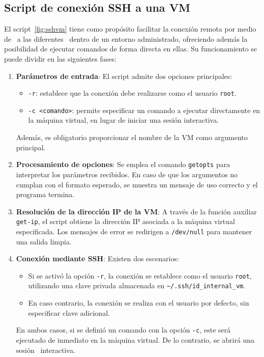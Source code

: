 \subsection{Script de conexión SSH a una VM}
\noindent
El script~\ref{fig:sshvm} tiene como propósito facilitar la conexión remota por medio de \SSH\ a las diferentes \VM\ dentro de un entorno administrado, ofreciendo además la posibilidad de ejecutar comandos de forma directa en ellas. Su funcionamiento se puede dividir en las siguientes fases:

\begin{enumerate}
    \item \textbf{Parámetros de entrada}:  
    El script admite dos opciones principales:
    \begin{itemize}
        \item \texttt{-r}: establece que la conexión debe realizarse como el usuario \texttt{root}.
        \item \texttt{-c <comando>}: permite especificar un comando a ejecutar directamente en la máquina virtual, en lugar de iniciar una sesión interactiva.
    \end{itemize}
    Además, es obligatorio proporcionar el nombre de la VM como argumento principal.

    \item \textbf{Procesamiento de opciones}:  
    Se emplea el comando \texttt{getopts} para interpretar los parámetros recibidos. En caso de que los argumentos no cumplan con el formato esperado, se muestra un mensaje de uso correcto y el programa termina.

    \item \textbf{Resolución de la dirección IP de la VM}:  
    A través de la función auxiliar \texttt{get-ip}, el script obtiene la dirección IP asociada a la máquina virtual especificada. Los mensajes de error se redirigen a \texttt{/dev/null} para mantener una salida limpia.

    \item \textbf{Conexión mediante SSH}:  
    Existen dos escenarios:
    \begin{itemize}
        \item Si se activó la opción \texttt{-r}, la conexión se establece como el usuario \texttt{root}, utilizando una clave privada almacenada en \texttt{\~{}/.ssh/id\_internal\_vm}.
        \item En caso contrario, la conexión se realiza con el usuario por defecto, sin especificar clave adicional.
    \end{itemize}
    En ambos casos, si se definió un comando con la opción \texttt{-c}, este será ejecutado de inmediato en la máquina virtual. De lo contrario, se abrirá una sesión \SSH\ interactiva.

\end{enumerate}

